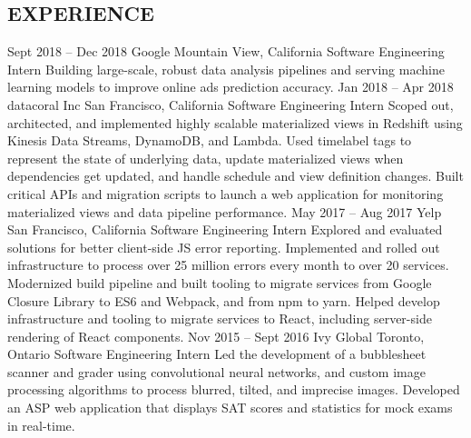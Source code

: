 \documentclass{resume}
\begin{document}
  \begin{main}
    \vspace{0.2cm}%
    \section{EXPERIENCE}
      \begin{entrylist}
        \rightentry%
          {Sept 2018 -- Dec 2018}%
          {Google}%
          {Mountain View, California}%
          {Software Engineering Intern}%
          {\createlist%
            {%
              Building large-scale, robust data analysis pipelines and serving machine learning %
              models to improve online ads prediction accuracy. %
            }%
          }
        \rightentry%
          {Jan 2018 -- Apr 2018}%
          {datacoral Inc}%
          {San Francisco, California}%
          {Software Engineering Intern}%
          {\createlist%
            {%
              Scoped out, architected, and implemented highly scalable materialized views in %
              Redshift using Kinesis Data Streams, DynamoDB, and Lambda. %
            }%
            {%
              Used timelabel tags to represent the state of underlying data, update materialized %
              views when dependencies get updated, and handle schedule and view definition %
              changes. %
            }%
            {%
              Built critical APIs and migration scripts to launch a web application for monitoring %
              materialized views and data pipeline performance. %
            }%
          }
        \rightentry%
          {May 2017 -- Aug 2017}%
          {Yelp}%
          {San Francisco, California}%
          {Software Engineering Intern}%
          {\createlist%
            {%
              Explored and evaluated solutions for better client-side JS error reporting. %
            }%
            {%
              Implemented and rolled out infrastructure to process over 25 million errors every %
              month to over 20 services. %
            }%
            {%
              Modernized build pipeline and built tooling to migrate services from Google Closure %
              Library to ES6 and Webpack, and from npm to yarn. %
            }%
            {%
              Helped develop infrastructure and tooling to migrate services to React, including %
              server-side rendering of React components. %
            }%
          }
        \rightentry%
          {Nov 2015 -- Sept 2016}%
          {Ivy Global}%
          {Toronto, Ontario}%
          {Software Engineering Intern}%
          {\createlist%
            {%
              Led the development of a bubblesheet scanner and grader using convolutional neural %
              networks, and custom image processing algorithms to process blurred, tilted, and %
              imprecise images. %
            }%
            {%
              Developed an ASP web application that displays SAT scores and statistics for mock %
              exams in real-time. %
            }%
          }
      \end{entrylist}

\end{main}
\end{document}
